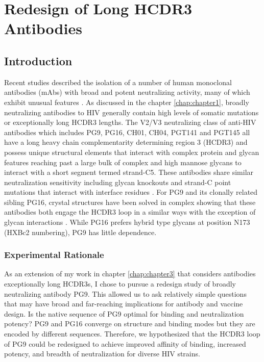 \chapter{Redesign of Long HCDR3 Antibodies}
\label{chap:chapter4}
\section{Introduction}
Recent studies described the isolation of a number of human monoclonal antibodies (mAbs) with broad and potent neutralizing activity, many of which exhibit unusual features \citep{Bonsignori:2011dq,McLellan:2011dg,Walker:2009cd,Walker:2011ew}. As discussed in the chapter \ref{chap:chapter1}, broadly neutralizing antibodies to HIV generally contain high levels of somatic mutations or exceptionally long HCDR3 lengths. The V2/V3 neutralizing class of anti-HIV antibodies which includes PG9, PG16, CH01, CH04, PGT141 and PGT145 all have a long heavy chain complementarity determining region 3 (HCDR3) and possess unique structural elements that interact with complex protein and glycan features reaching past a large bulk of complex and high mannose glycans to interact with a short segment termed strand-C5. These antibodies share similar neutralization sensitivity including glycan knockouts and strand-C point mutations that interact with interface residues \citep{DoriaRose:2012if,Doores:2010gn}.  For PG9 and its clonally related sibling PG16, crystal structures have been solved in complex showing that these antibodies both engage the HCDR3 loop in a similar ways with the exception of glycan interactions \citep{Pancera:2013ev}. While PG16 prefers hybrid type glycans at position N173 (HXBc2 numbering), PG9 has little dependence. 

\subsection{Experimental Rationale}
As an extension of my work in chapter \ref{chap:chapter3} that considers antibodies exceptionally long HCDR3s, I chose to pursue a redesign study of broadly neutralizing antibody PG9. This allowed us to ask relatively simple questions that may have broad and far-reaching implications for antibody and vaccine design. Is the native sequence of PG9 optimal for binding and neutralization potency? PG9 and PG16 converge on structure and binding modes but they are encoded by different sequences. Therefore, we hypothesized that the HCDR3 loop of PG9 could be redesigned to achieve improved affinity of binding, increased potency, and breadth of neutralization for diverse HIV strains. 

